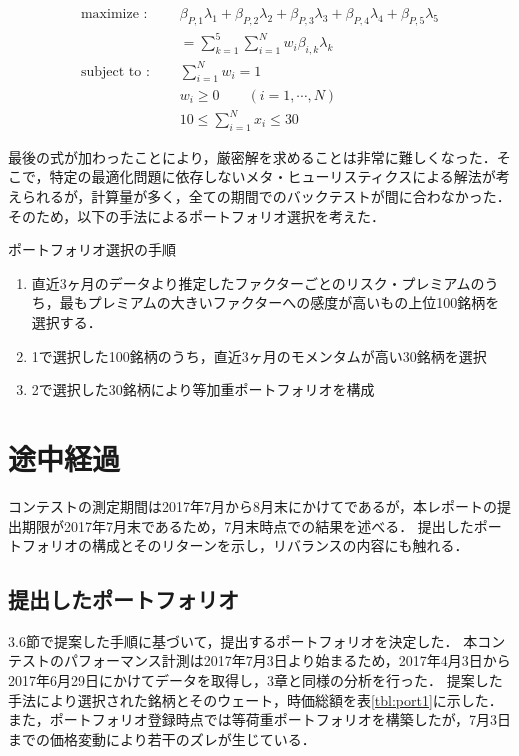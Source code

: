 ﻿\documentclass[11pt]{jreport}
\begin{document}
\begin{equation}
\begin{split}
\text{maximize : }\quad & \beta_{P,1}\lambda_1 + \beta_{P,2}\lambda_2 + \beta_{P,3}\lambda_3 + \beta_{P,4}\lambda_4 + \beta_{P,5}\lambda_5\\
& = \sum_{k=1}^5 \sum_{i=1}^N w_i \beta_{i,k} \lambda_k\\
\text{subject to : }\quad & \sum_{i=1}^N w_i = 1\\
& w_i \geq 0\qquad(i=1,\cdots,N)\\
&10 \leq \sum_{i=1}^Nx_i \leq 30
\end{split}
\label{eq:port_optim}
\end{equation}

最後の式が加わったことにより，厳密解を求めることは非常に難しくなった．そこで，特定の最適化問題に依存しないメタ・ヒューリスティクスによる解法が考えられるが，計算量が多く，全ての期間でのバックテストが間に合わなかった．そのため，以下の手法によるポートフォリオ選択を考えた．

\begin{itembox}[l]{ポートフォリオ選択の手順}
\begin{enumerate}
\item 直近3ヶ月のデータより推定したファクターごとのリスク・プレミアムのうち，最もプレミアムの大きいファクターへの感度が高いもの上位100銘柄を選択する．
\item 1で選択した100銘柄のうち，直近3ヶ月のモメンタムが高い30銘柄を選択
\item 2で選択した30銘柄により等加重ポートフォリオを構成
\end{enumerate}
\end{itembox}

\chapter{途中経過}
コンテストの測定期間は2017年7月から8月末にかけてであるが，本レポートの提出期限が2017年7月末であるため，7月末時点での結果を述べる．
提出したポートフォリオの構成とそのリターンを示し，リバランスの内容にも触れる．
\section{提出したポートフォリオ}
3.6節で提案した手順に基づいて，提出するポートフォリオを決定した．
本コンテストのパフォーマンス計測は2017年7月3日より始まるため，2017年4月3日から2017年6月29日にかけてデータを取得し，3章と同様の分析を行った．
提案した手法により選択された銘柄とそのウェート，時価総額を表\ref{tbl:port1}に示した．
また，ポートフォリオ登録時点では等荷重ポートフォリオを構築したが，7月3日までの価格変動により若干のズレが生じている．
\end{document}
